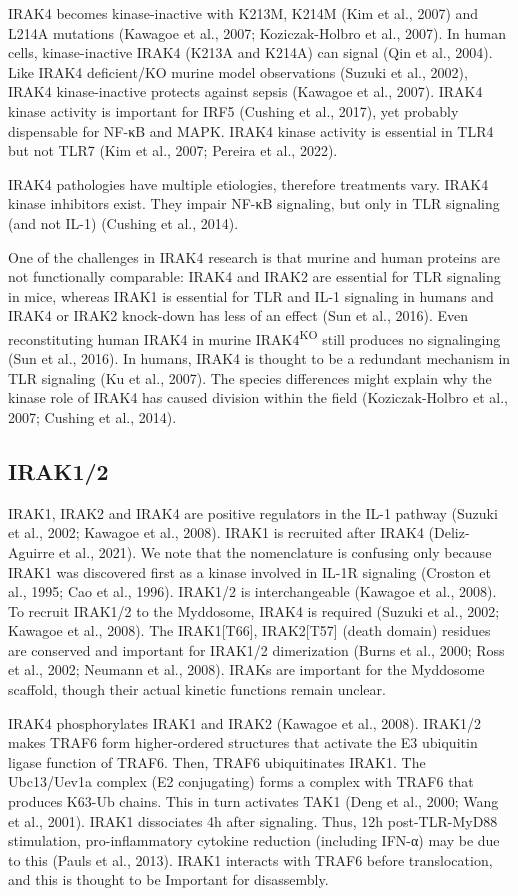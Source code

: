 IRAK4 becomes kinase-inactive with K213M, K214M (Kim et al., 2007) and L214A mutations (Kawagoe et al., 2007; Koziczak-Holbro et al., 2007). In human cells, kinase-inactive IRAK4 (K213A and K214A) can signal (Qin et al., 2004). Like IRAK4 deficient/KO murine model observations (Suzuki et al., 2002), IRAK4 kinase-inactive protects against sepsis (Kawagoe et al., 2007). IRAK4 kinase activity is important for IRF5 (Cushing et al., 2017), yet probably dispensable for NF-κB and MAPK. IRAK4 kinase activity is essential in TLR4 but not TLR7 (Kim et al., 2007; Pereira et al., 2022).

IRAK4 pathologies have multiple etiologies, therefore treatments vary. IRAK4 kinase inhibitors exist. They impair NF-κB signaling, but only in TLR signaling (and not IL-1{\textbeta}) (Cushing et al., 2014).

One of the challenges in IRAK4 research is that murine and human proteins are not functionally comparable: IRAK4 and IRAK2 are essential for TLR signaling in mice, whereas IRAK1 is essential for TLR and IL-1 signaling in humans and IRAK4 or IRAK2 knock-down has less of an effect (Sun et al., 2016). Even reconstituting human IRAK4 in murine IRAK4\textsuperscript{KO} still produces no signalinging (Sun et al., 2016). In humans, IRAK4 is thought to be a redundant mechanism in TLR signaling (Ku et al., 2007). The species differences might explain why the kinase role of IRAK4 has caused division within the field (Koziczak-Holbro et al., 2007; Cushing et al., 2014).

\subsection{IRAK1/2}
IRAK1, IRAK2 and IRAK4 are positive regulators in the IL-1 pathway (Suzuki et al., 2002; Kawagoe et al., 2008). IRAK1 is recruited after IRAK4 (Deliz-Aguirre et al., 2021). We note that the nomenclature is confusing only because IRAK1 was discovered first as a kinase involved in IL-1R signaling (Croston et al., 1995; Cao et al., 1996). IRAK1/2 is interchangeable (Kawagoe et al., 2008). To recruit IRAK1/2 to the Myddosome, IRAK4 is required (Suzuki et al., 2002; Kawagoe et al., 2008). The IRAK1[T66], IRAK2[T57] (death domain) residues are conserved and important for IRAK1/2 dimerization (Burns et al., 2000; Ross et al., 2002; Neumann et al., 2008). IRAKs are important for the Myddosome scaffold, though their actual kinetic functions remain unclear. 

IRAK4 phosphorylates IRAK1 and IRAK2 (Kawagoe et al., 2008). IRAK1/2 makes TRAF6 form higher-ordered structures that activate the E3 ubiquitin ligase function of TRAF6. Then, TRAF6 ubiquitinates IRAK1. The Ubc13/Uev1a complex (E2 conjugating) forms a complex with TRAF6 that produces K63-Ub chains. This in turn activates TAK1 (Deng et al., 2000; Wang et al., 2001). IRAK1 dissociates 4h after signaling. Thus, 12h post-TLR-MyD88 stimulation, pro-inflammatory cytokine reduction (including IFN-α) may be due to this (Pauls et al., 2013). IRAK1 interacts with TRAF6 before translocation, and this is thought to be Important for disassembly.

